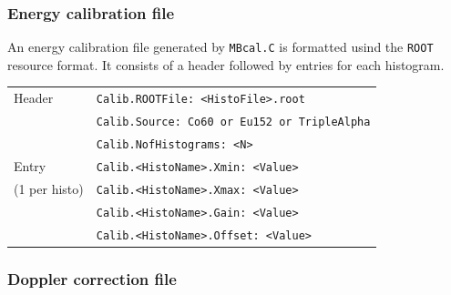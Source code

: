 \documentclass[10pt]{article}
\begin{document}
\subsubsection{Energy calibration file}\label{MBcalFileFormat}

An energy calibration file generated by \texttt{MBcal.C} is formatted usind the \texttt{ROOT} resource format.
It consists of a header followed by entries for each histogram.

\begin{center}
\begin{tabular}{|l|l|}
\hline
Header	&	\texttt{Calib.ROOTFile: <HistoFile>.root}		\\
	&	\texttt{Calib.Source: Co60 or Eu152 or TripleAlpha}		\\
	&	\texttt{Calib.NofHistograms: <N>}		\\
\hline
Entry	&	\texttt{Calib.<HistoName>.Xmin:	<Value>}	\\
(1 per histo) &	\texttt{Calib.<HistoName>.Xmax:	<Value>}	\\
	&	\texttt{Calib.<HistoName>.Gain: <Value>}	\\
	&	\texttt{Calib.<HistoName>.Offset: <Value>}	\\
\hline
\end{tabular}
\end{center}

\subsubsection{Doppler correction file}\label{DCorrFileFormat}
\end{document}
